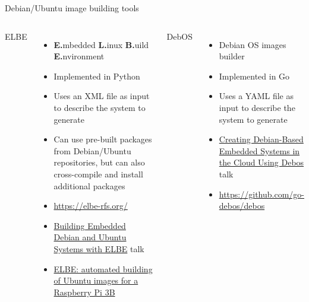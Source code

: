 \begin{frame}{Debian/Ubuntu image building tools}
  \begin{columns}
    ELBE
    \begin{itemize}
    \item {\bf E.}mbedded {\bf L.}inux {\bf B.}uild {\bf E.}nvironment
    \item Implemented in Python
    \item Uses an XML file as input to describe the system to generate
    \item Can use pre-built packages from Debian/Ubuntu repositories,
      but can also cross-compile and install additional packages
    \item \url{https://elbe-rfs.org/}
    \item \href{https://www.youtube.com/watch?v=BwHzyCGB7As}{Building
        Embedded Debian and Ubuntu Systems with ELBE} talk
    \item
      \href{https://bootlin.com/blog/elbe-automated-building-of-ubuntu-images-for-a-raspberry-pi-3b/}{ELBE:
        automated building of Ubuntu images for a Raspberry Pi 3B}
    \end{itemize}
    DebOS
    \begin{itemize}
    \item Debian OS images builder
    \item Implemented in Go
    \item Uses a YAML file as input to describe the system to generate
    \item \href{https://www.youtube.com/watch?v=_NZrSR3prwk}{Creating
        Debian-Based Embedded Systems in the Cloud Using Debos} talk
    \item \url{https://github.com/go-debos/debos}
    \end{itemize}
  \end{columns}
\end{frame}

